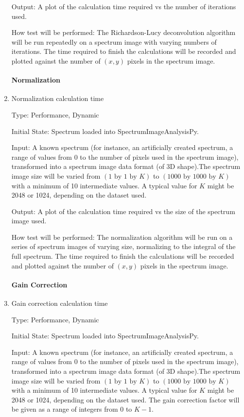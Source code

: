 \documentclass[12pt, titlepage]{article}
\newcommand{\progname}{SpectrumImageAnalysisPy}
\begin{document}
\begin{enumerate}
Output: A plot of the calculation time required vs the number of iterations used.

How test will be performed: The Richardson-Lucy deconvolution algorithm will be run repeatedly on a spectrum image with varying numbers of iterations. The time required to finish the calculations will be recorded and plotted against the number of $(x, y)$ pixels in the spectrum image.\\

\paragraph{Normalization}
\item{Normalization calculation time}

Type: Performance, Dynamic

Initial State: Spectrum loaded into \progname{}.

Input: A known spectrum (for instance, an artificially created spectrum, a range of values from 0 to the number of pixels used in the spectrum image), transformed into a spectrum image data format (of 3D shape).The spectrum image size will be varied from $(1\text{ by }1\text{ by }K)$ to $(1000 \text{ by } 1000 \text{ by }K)$ with a minimum of 10 intermediate values. A typical value for $K$ might be 2048 or 1024, depending on the dataset used.

Output: A plot of the calculation time required vs the size of the spectrum image used.

How test will be performed: The normalization algorithm will be run on a series of spectrum images of varying size, normalizing to the integral of the full spectrum. The time required to finish the calculations will be recorded and plotted against the number of $(x, y)$ pixels in the spectrum image.\\

\paragraph{Gain Correction}
\item{Gain correction calculation time}

Type: Performance, Dynamic

Initial State: Spectrum loaded into \progname{}.

Input: A known spectrum (for instance, an artificially created spectrum, a range of values from 0 to the number of pixels used in the spectrum image), transformed into a spectrum image data format (of 3D shape).The spectrum image size will be varied from $(1\text{ by }1\text{ by }K)$ to $(1000 \text{ by } 1000 \text{ by }K)$ with a minimum of 10 intermediate values. A typical value for $K$ might be 2048 or 1024, depending on the dataset used. The gain correction factor will be given as a range of integers from 0 to $K-1$.


\end{enumerate}
\end{document}
